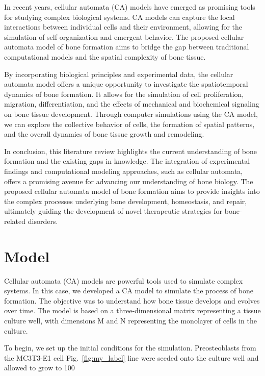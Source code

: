 \documentclass[conference]{IEEEtran}
\begin{document}
In recent years, cellular automata (CA) models have emerged as promising tools for studying complex biological systems. CA models can capture the local interactions between individual cells and their environment, allowing for the simulation of self-organization and emergent behavior. The proposed cellular automata model of bone formation aims to bridge the gap between traditional computational models and the spatial complexity of bone tissue.

By incorporating biological principles and experimental data, the cellular automata model offers a unique opportunity to investigate the spatiotemporal dynamics of bone formation. It allows for the simulation of cell proliferation, migration, differentiation, and the effects of mechanical and biochemical signaling on bone tissue development. Through computer simulations using the CA model, we can explore the collective behavior of cells, the formation of spatial patterns, and the overall dynamics of bone tissue growth and remodeling.

In conclusion, this literature review highlights the current understanding of bone formation and the existing gaps in knowledge. The integration of experimental findings and computational modeling approaches, such as cellular automata, offers a promising avenue for advancing our understanding of bone biology. The proposed cellular automata model of bone formation aims to provide insights into the complex processes underlying bone development, homeostasis, and repair, ultimately guiding the development of novel therapeutic strategies for bone-related disorders.

\section{Model}
Cellular automata (CA) models are powerful tools used to simulate complex systems. In this case, we developed a CA model to simulate the process of bone formation. The objective was to understand how bone tissue develops and evolves over time. The model is based on a three-dimensional matrix representing a tissue culture well, with dimensions M and N representing the monolayer of cells in the culture.

To begin, we set up the initial conditions for the simulation. Preosteoblasts from the MC3T3-E1 cell Fig.~\ref{fig:my_label} line were seeded onto the culture well and allowed to grow to 100%
\end{document}
